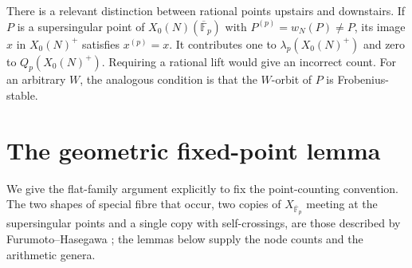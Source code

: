 \documentclass[11pt,a4paper]{article}
\theoremstyle{remark}\newtheorem{remark}[theorem]{Remark}
\numberwithin{equation}{section}
\newcommand{\kk}{\overline{\mathbb F}_p}
\begin{document}
	There is a relevant distinction between rational points upstairs and downstairs. If $P$ is a supersingular point of $X_0(N)(\kk)$ with $P^{(p)}=w_N(P)\ne P$, its image $x$ in $X_0(N)^+$ satisfies $x^{(p)}=x$. It contributes one to $\lambda_p(X_0(N)^+)$ and zero to $Q_p(X_0(N)^+)$. Requiring a rational lift would give an incorrect count. For an arbitrary $W$, the analogous condition is that the $W$-orbit of $P$ is Frobenius-stable.
	
	\section{The geometric fixed-point lemma}\label{sec:geometry}
	We give the flat-family argument explicitly to fix the point-counting convention. The two shapes of special fibre that occur, two copies of $X_{\kk}$ meeting at the supersingular points and a single copy with self-crossings, are those described by Furumoto--Hasegawa \cite[Section 5, Figures 1 and 2]{FH}; the lemmas below supply the node counts and the arithmetic genera.
	
\end{document}
